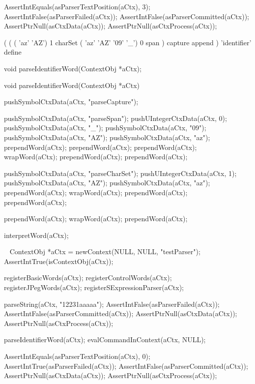   AssertIntEquals(asParserTextPosition(aCtx), 3);
  AssertIntFalse(asParserFailed(aCtx));
  AssertIntFalse(asParserCommitted(aCtx));
  AssertPtrNull(asCtxData(aCtx));
  AssertPtrNull(asCtxProcess(aCtx));
\stopCTest
\stopTestCase
\stopTestSuite

\startTestSuite[parseIdentifierWord]

\starttyping
(
  (
    ( 'az' 'AZ') 1 charSet
    ( 'az' 'AZ' '09' '_') 0 span
  ) capture append
) 'identifier' define
\stoptyping

\startCHeader
void parseIdentifierWord(ContextObj *aCtx);
\stopCHeader

\startCCode
void parseIdentifierWord(ContextObj *aCtx) {

  pushSymbolCtxData(aCtx, "parseCapture");

  pushSymbolCtxData(aCtx, "parseSpan");
  pushUIntegerCtxData(aCtx, 0);
  pushSymbolCtxData(aCtx, "_");
  pushSymbolCtxData(aCtx, "09");
  pushSymbolCtxData(aCtx, "AZ");
  pushSymbolCtxData(aCtx, "az");
  prependWord(aCtx);
  prependWord(aCtx);
  prependWord(aCtx);
  wrapWord(aCtx);
  prependWord(aCtx);
  prependWord(aCtx);

  pushSymbolCtxData(aCtx, "parseCharSet");
  pushUIntegerCtxData(aCtx, 1);
  pushSymbolCtxData(aCtx, "AZ");
  pushSymbolCtxData(aCtx, "az");
  prependWord(aCtx);
  wrapWord(aCtx);
  prependWord(aCtx);
  prependWord(aCtx);
  
  prependWord(aCtx);
  wrapWord(aCtx);
  prependWord(aCtx);
  
  interpretWord(aCtx);
}
\stopCCode

\CTestsSuiteSetup\
\startCTest
  ContextObj *aCtx = newContext(NULL, NULL, "testParser");
  AssertIntTrue(isContextObj(aCtx));
  
  registerBasicWords(aCtx);
  registerControlWords(aCtx);
  registerJPegWords(aCtx);
  registerSExpressionParser(aCtx);
\stopCTest

\startCTest
  parseString(aCtx, "12231aaaaa");
  AssertIntFalse(asParserFailed(aCtx));
  AssertIntFalse(asParserCommitted(aCtx));
  AssertPtrNull(asCtxData(aCtx));
  AssertPtrNull(asCtxProcess(aCtx));
  
  parseIdentifierWord(aCtx);
  evalCommandInContext(aCtx, NULL);
  
  AssertIntEquals(asParserTextPosition(aCtx), 0);
  AssertIntTrue(asParserFailed(aCtx));
  AssertIntFalse(asParserCommitted(aCtx));
  AssertPtrNull(asCtxData(aCtx));
  AssertPtrNull(asCtxProcess(aCtx));
\stopCTest
\stopTestCase

